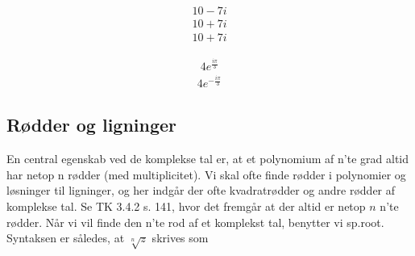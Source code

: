 \documentclass[letterpaper,10pt,english]{jupyterBook}
\begin{document}
\begin{sphinxVerbatim}[commandchars=\\\{\}]
          
            
\end{sphinxVerbatim}
\begin{equation*}
\begin{split}\displaystyle 10 - 7 i\end{split}
\end{equation*}\begin{equation*}
\begin{split}\displaystyle 10 + 7 i\end{split}
\end{equation*}\begin{equation*}
\begin{split}\displaystyle 10 + 7 i\end{split}
\end{equation*}
\begin{sphinxVerbatim}[commandchars=\\\{\}]
\end{sphinxVerbatim}
\begin{equation*}
\begin{split}\displaystyle 4 e^{\frac{i \pi}{3}}\end{split}
\end{equation*}\begin{equation*}
\begin{split}\displaystyle 4 e^{- \frac{i \pi}{3}}\end{split}
\end{equation*}

\subsection{Rødder og ligninger}
\label{\detokenize{notebooks/sympy/Notebook_kompleks:rodder-og-ligninger}}
En central egenskab ved de komplekse tal er, at et polynomium af n’te grad altid har netop n rødder (med multiplicitet). Vi skal ofte finde rødder i polynomier og løsninger til ligninger, og her indgår der ofte kvadratrødder og andre rødder af komplekse tal. Se TK 3.4.2 s. 141, hvor det fremgår at der altid er netop \(n\) n’te rødder. Når vi vil finde den n’te rod af et komplekst tal, benytter vi sp.root. Syntaksen er således, at \(\sqrt[n]{z}\) skrives som
\end{document}
